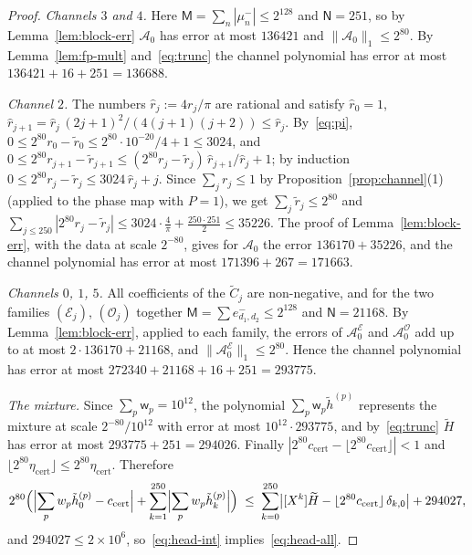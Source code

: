 \documentclass[11pt,reqno]{amsart}
\theoremstyle{definition}
\numberwithin{equation}{section}
\newcommand{\lone}[1]{\|#1\|_1}
\newcommand{\ccert}{c_{\mathrm{cert}}}
\begin{document}
\begin{proof}
\emph{Channels $3$ and $4$.} Here $\mathsf{M}=\sum_n|\mu_n^-|\le2^{128}$ and $\mathsf{N}=251$, so by Lemma~\ref{lem:block-err} $\mathcal{A}_0$ has error at most $136421$ and $\lone{\mathcal{A}_0}\le2^{80}$. By Lemma~\ref{lem:fp-mult} and~\eqref{eq:trunc} the channel polynomial has error at most $136421+16+251=136688$.

\emph{Channel $2$.} The numbers $\hat r_j:=4r_j/\pi$ are rational and satisfy $\hat r_0=1$, $\hat r_{j+1}=\hat r_j\,(2j+1)^2/(4(j+1)(j+2))\le\hat r_j$. By~\eqref{eq:pi}, $0\le2^{80}r_0-\tilde r_0\le2^{80}\cdot10^{-20}/4+1\le3024$, and $0\le2^{80}r_{j+1}-\tilde r_{j+1}\le(2^{80}r_j-\tilde r_j)\,\hat r_{j+1}/\hat r_j+1$; by induction $0\le2^{80}r_j-\tilde r_j\le3024\,\hat r_j+j$. Since $\sum_jr_j\le1$ by Proposition~\ref{prop:channel}(1) (applied to the phase map with $P=1$), we get $\sum_j\tilde r_j\le2^{80}$ and $\sum_{j\le250}|2^{80}r_j-\tilde r_j|\le3024\cdot\frac4\pi+\frac{250\cdot251}{2}\le35226$. The proof of Lemma~\ref{lem:block-err}, with the data at scale $2^{-80}$, gives for $\mathcal{A}_0$ the error $136170+35226$, and the channel polynomial has error at most $171396+267=171663$.

\emph{Channels $0$, $1$, $5$.} All coefficients of the $\widetilde C_j$ are non-negative, and for the two families $(\mathcal{E}_j)$, $(\mathcal{O}_j)$ together $\mathsf{M}=\sum e^-_{d_1,d_2}\le2^{128}$ and $\mathsf{N}=21168$. By Lemma~\ref{lem:block-err}, applied to each family, the errors of $\mathcal{A}^{\mathcal{E}}_0$ and $\mathcal{A}^{\mathcal{O}}_0$ add up to at most $2\cdot136170+21168$, and $\lone{\mathcal{A}^{\mathcal{E}}_0}\le2^{80}$. Hence the channel polynomial has error at most $272340+21168+16+251=293775$.

\emph{The mixture.} Since $\sum_p\mathsf{w}_p=10^{12}$, the polynomial $\sum_p\mathsf{w}_p\widetilde h^{(p)}$ represents the mixture at scale $2^{-80}/10^{12}$ with error at most $10^{12}\cdot293775$, and by~\eqref{eq:trunc} $\widetilde H$ has error at most $293775+251=294026$. Finally $|2^{80}\ccert-\lfloor2^{80}\ccert\rfloor|<1$ and $\lfloor2^{80}\eta_{\mathrm{cert}}\rfloor\le2^{80}\eta_{\mathrm{cert}}$. Therefore
\[
  2^{80}\Bigl(\Bigl|\sum_pw_p\tilde h^{(p)}_0-\ccert\Bigr|+\sum_{k=1}^{250}\Bigl|\sum_pw_p\tilde h^{(p)}_k\Bigr|\Bigr)
  \;\le\;\sum_{k=0}^{250}\bigl|[X^k]\widetilde H-\lfloor2^{80}\ccert\rfloor\,\delta_{k,0}\bigr|+294027 ,
\]
and $294027\le2\times10^6$, so~\eqref{eq:head-int} implies~\eqref{eq:head-all}.
\end{proof}
\end{document}
